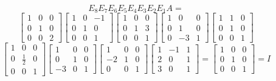 \documentclass{article}
\begin{document}
\begin{enumerate}[listparindent=\parindent]
\[
    E_8E_7E_6E_5E_4E_3E_2E_1A =
\]
\[
    \begin{bmatrix}
        1 & 0 & 0 \\
        0 & 1 & 0 \\
        0 & 0 & 2
    \end{bmatrix}
    \begin{bmatrix}
        1 & 0 & -1 \\
        0 & 1 & 0 \\
        0 & 0 & 1
    \end{bmatrix}
    \begin{bmatrix}
        1 & 0 & 0 \\
        0 & 1 & 3 \\
        0 & 0 & 1
    \end{bmatrix}
    \begin{bmatrix}
        1 & 0 & 0 \\
        0 & 1 & 0 \\
        0 & -3 & 1
    \end{bmatrix}
    \begin{bmatrix}
        1 & 1 & 0 \\
        0 & 1 & 0 \\
        0 & 0 & 1
    \end{bmatrix}
\]
\[
    \begin{bmatrix}
        1 & 0 & 0 \\
        0 & \frac{1}{2} & 0 \\
        0 & 0 & 1
    \end{bmatrix}
    \begin{bmatrix}
        1 & 0 & 0 \\
        0 & 1 & 0 \\
        -3 & 0 & 1
    \end{bmatrix}
    \begin{bmatrix}
        1 & 0 & 0 \\
        -2 & 1 & 0 \\
        0 & 0 & 1
    \end{bmatrix}
    \begin{bmatrix}
        1 & -1 & 1 \\
        2 & 0 & 1 \\
        3 & 0 & 1
    \end{bmatrix}
    =
    \begin{bmatrix}
        1 & 0 & 0 \\
        0 & 1 & 0 \\
        0 & 0 & 1
    \end{bmatrix}
    = I
\]


\end{enumerate}
\end{document}
